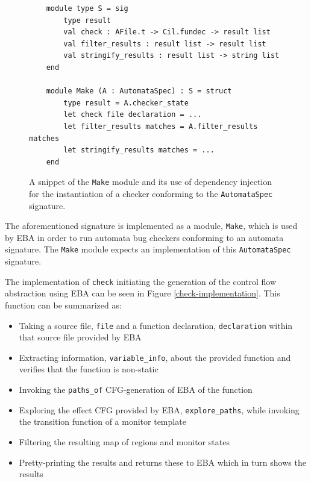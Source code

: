 \begin{figure}[H]
    \centering
    \begin{verbatim}
    module type S = sig
        type result
        val check : AFile.t -> Cil.fundec -> result list
        val filter_results : result list -> result list
        val stringify_results : result list -> string list
    end

    module Make (A : AutomataSpec) : S = struct
        type result = A.checker_state
        let check file declaration = ...
        let filter_results matches = A.filter_results matches
        let stringify_results matches = ...
    end
    \end{verbatim}
    \caption{A snippet of the \texttt{Make} module and its use of dependency injection for the instantiation of a checker conforming to the \texttt{AutomataSpec} signature.}
    \label{make-signature}
\end{figure}

\newpar The aforementioned signature is implemented as a module, \texttt{Make}, which is used by EBA in order to run automata bug checkers conforming to an automata signature. The \texttt{Make} module expects an implementation of this \texttt{AutomataSpec} signature. 

\noindent The implementation of \texttt{check} initiating the generation of the control flow abstraction using EBA can be seen in Figure \ref{check-implementation}. This function can be summarized as:

\begin{itemize}
    \item Taking a source file, \texttt{file} and a function declaration, \texttt{declaration} within that source file provided by EBA
    \item Extracting information, \texttt{variable\_info}, about the provided function and verifies that the function is non-static
    \item Invoking the \texttt{paths\_of} CFG-generation of EBA of the function
    \item Exploring the effect CFG provided by EBA, \texttt{explore\_paths}, while invoking the transition function of a monitor template
    \item Filtering the resulting map of regions and monitor states
    \item Pretty-printing the results and returns these to EBA which in turn shows the results 
\end{itemize}

